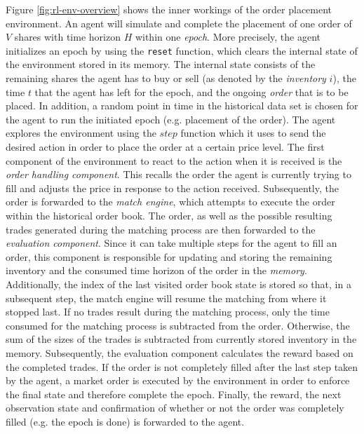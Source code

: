 Figure \ref{fig:rl-env-overview} shows the inner workings of the order placement environment.
An agent will simulate and complete the placement of one order of $V$ shares with time horizon $H$ within one \textit{epoch}.
More precisely, the agent initializes an epoch by using the \texttt{reset} function, which clears the internal state of the environment stored in its memory.
The internal state consists of the remaining shares the agent has to buy or sell (as denoted by the \textit{inventory} $i$), the time $t$ that the agent has left for the epoch, and the ongoing \textit{order} that is to be placed.
In addition, a random point in time in the historical data set is chosen for the agent to run the initiated epoch (e.g. placement of the order).
The agent explores the environment using the $step$ function which it uses to send the desired action in order to place the order at a certain price level.
The first component of the environment to react to the action when it is received is the \textit{order handling component}. This recalls the order the agent is currently trying to fill and adjusts the price in response to the action received.
Subsequently, the order is forwarded to the \textit{match engine}, which attempts to execute the order within the historical order book.
The order, as well as the possible resulting trades generated during the matching process are then forwarded to the \textit{evaluation component}.
Since it can take multiple steps for the agent to fill an order, this component is responsible for updating and storing the remaining inventory and the consumed time horizon of the order in the \textit{memory}.
Additionally, the index of the last visited order book state is stored so that, in a subsequent step, the match engine will resume the matching from where it stopped last.
If no trades result during the matching process, only the time consumed for the matching process is subtracted from the order.
Otherwise, the sum of the sizes of the trades is subtracted from currently stored inventory in the memory.
Subsequently, the evaluation component calculates the reward based on the completed trades.
If the order is not completely filled after the last step taken by the agent, a market order is executed by the environment in order to enforce the final state and therefore complete the epoch.
Finally, the reward, the next observation state and confirmation of whether or not the order was completely filled (e.g. the epoch is done) is forwarded to the agent.

